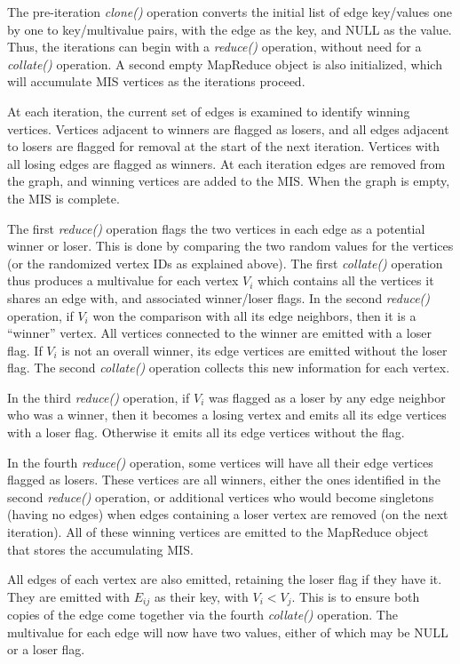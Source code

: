 The pre-iteration {\it clone()} operation converts the initial list of edge
key/values one by one to key/multivalue pairs, with the edge as the
key, and NULL as the value.  Thus, the iterations can begin with
a {\it reduce()} operation, without need for a {\it collate()} operation.  A
second empty MapReduce object is also initialized, which will
accumulate MIS vertices as the iterations proceed.

At each iteration, the current set of edges is examined to identify
winning vertices.  Vertices adjacent to winners are flagged as losers,
and all edges adjacent to losers are flagged for removal at the start
of the next iteration.  Vertices with all losing edges are flagged as
winners.  At each iteration edges are removed from the graph, and
winning vertices are added to the MIS.  When the graph is empty, the
MIS is complete.

The first {\it reduce()} operation flags the two vertices in each edge as a
potential winner or loser.  This is done by comparing the two random
values for the vertices (or the randomized vertex IDs as explained
above).  The first {\it collate()} operation thus produces a multivalue for
each vertex $V_i$ which contains all the vertices it shares an edge
with, and associated winner/loser flags.  In the second {\it reduce()}
operation, if $V_i$ won the comparison with all its edge neighbors,
then it is a ``winner'' vertex.  All vertices connected to the winner
are emitted with a loser flag.  If $V_i$ is not an overall winner, its
edge vertices are emitted without the loser flag.  The second
{\it collate()} operation collects this new information for each vertex.

In the third {\it reduce()} operation, if $V_i$ was flagged as a loser by
any edge neighbor who was a winner, then it becomes a losing vertex
and emits all its edge vertices with a loser flag.  Otherwise it emits
all its edge vertices without the flag.

In the fourth {\it reduce()} operation, some vertices will have all their
edge vertices flagged as losers.  These vertices are all winners,
either the ones identified in the second {\it reduce()} operation, or
additional vertices who would become singletons (having no edges) when
edges containing a loser vertex are removed (on the next iteration).
All of these winning vertices are emitted to the MapReduce object that
stores the accumulating MIS.

All edges of each vertex are also emitted, retaining the loser flag if
they have it.  They are emitted with $E_{ij}$ as their key, with $V_i <
V_j$.  This is to ensure both copies of the edge come together via the
fourth {\it collate()} operation.  The multivalue for each edge will now
have two values, either of which may be NULL or a loser flag.

